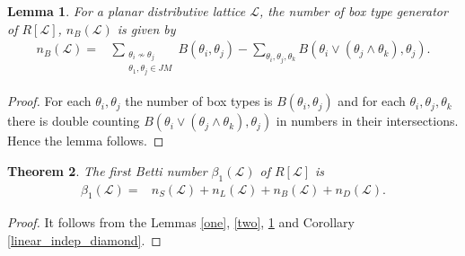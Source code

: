 \documentclass[10pt,reqno]{amsart}
\numberwithin{equation}{section}
\newtheorem{theorem}{Theorem}[section]
\newtheorem{lemma}[theorem]{Lemma}
\begin{document}
\begin{lemma}
\label{three}
 For a planar distributive lattice $\mathcal{L}$, the number of box type generator of $R[\mathcal{L}]$, $n_{B}(\mathcal{L})$ is
 given by
 \begin{align*}
  n_{B}(\mathcal{L})=& \sum_{\substack{\theta_i \nsim \theta_j \\ \theta_1,\theta_j \in JM}}B(\theta_i,\theta_j)
  -\sum_{\theta_i,\theta_j,\theta_k}B(\theta_i \vee (\theta_j \wedge \theta_k),\theta_j).
 \end{align*}
\end{lemma}
\begin{proof}
For each $\theta_i,\theta_j$ the number of box types is $B(\theta_i,\theta_j)$ and for each $\theta_i,
\theta_j,\theta_k$ there is double counting $B(\theta_i \vee (\theta_j \wedge \theta_k),\theta_j)$ in numbers in their
intersections.
Hence the lemma follows.
\end{proof}
\begin{theorem}\label{betti} The first Betti number $\beta_1(\mathcal{L})$ of $R[\mathcal{L}]$ is 
\begin{align*}
 \beta_1(\mathcal{L})=&n_{S}(\mathcal{L})+n_{L}(\mathcal{L})+n_{B}(\mathcal{L})+n_{D}(\mathcal{L}).
\end{align*}
\end{theorem}
\begin{proof}
It follows from the Lemmas \ref{one}, \ref{two}, \ref{three} and Corollary \ref{linear_indep_diamond}.
\end{proof}
\end{document}
